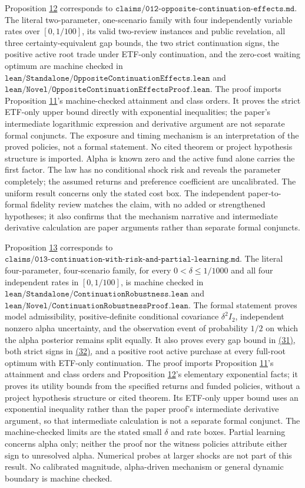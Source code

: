 \documentclass[11pt]{article}
\begin{document}
Proposition \hyperref[res:Proposition-12]{12} corresponds to
\(\texttt{claims/012-opposite-continuation-effects.md}\).
The literal two-parameter, one-scenario family with four
independently variable rates over \([0,1/100]\), its valid
two-review instances and public revelation, all three
certainty-equivalent gap bounds, the two strict continuation
signs, the positive active root trade under ETF-only
continuation, and the zero-cost waiting optimum are machine
checked in
\(\texttt{lean/Standalone/OppositeContinuationEffects.lean}\)
and \(\texttt{lean/Novel/OppositeContinuationEffectsProof.lean}\).
The proof imports Proposition \hyperref[res:Proposition-11]{11}'s machine-checked attainment
and class orders. It proves the strict ETF-only upper bound
directly with exponential inequalities; the paper's
intermediate logarithmic expression and derivative argument
are not separate formal conjuncts. The exposure and timing
mechanism is an interpretation of the proved policies, not a
formal statement. No cited theorem or project hypothesis
structure is imported. Alpha is known zero and the active
fund alone carries the first factor. The law has no conditional
shock risk and reveals the parameter completely; the assumed
returns and preference coefficient are uncalibrated. The
uniform result concerns only the stated cost box. The
independent paper-to-formal fidelity review matches the claim,
with no added or strengthened hypotheses; it also confirms that
the mechanism narrative and intermediate derivative calculation
are paper arguments rather than separate formal conjuncts.

Proposition \hyperref[res:Proposition-13]{13} corresponds to
\(\texttt{claims/013-continuation-with-risk-and-partial-learning.md}\).
The literal four-parameter, four-scenario family, for every
\(0<\delta\leq1/1000\) and all four independent rates in
\([0,1/100]\), is machine checked in
\(\texttt{lean/Standalone/ContinuationRobustness.lean}\)
and \(\texttt{lean/Novel/ContinuationRobustnessProof.lean}\).
The formal statement proves model admissibility, positive-definite
conditional covariance \(\delta^2I_2\), independent nonzero
alpha uncertainty, and the observation event of probability
\(1/2\) on which the alpha posterior remains split equally.
It also proves every gap bound in \hyperref[eq:31]{(31)}, both strict signs in
\hyperref[eq:32]{(32)}, and a positive root active purchase at every full-root
optimum with ETF-only continuation. The proof imports
Proposition \hyperref[res:Proposition-11]{11}'s attainment and class orders and Proposition \hyperref[res:Proposition-12]{12}'s
elementary exponential facts; it proves its utility bounds
from the specified returns and funded policies, without a
project hypothesis structure or cited theorem. Its ETF-only
upper bound uses an exponential inequality rather than the
paper proof's intermediate derivative argument, so that
intermediate calculation is not a separate formal conjunct.
The machine-checked limits are the stated small \(\delta\)
and rate boxes. Partial learning concerns alpha only; neither
the proof nor the witness policies attribute either sign to
unresolved alpha. Numerical probes at larger shocks are not
part of this result. No calibrated magnitude, alpha-driven
mechanism or general dynamic boundary is machine checked.
\end{document}
